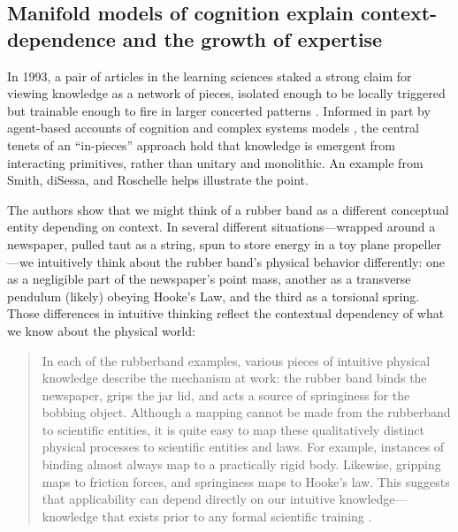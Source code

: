 \subsection{Manifold models of cognition explain context-dependence
and the growth of
expertise}\label{manifold-models-of-cognition-explain-context-dependence-and-the-growth-of-expertise}

In 1993, a pair of articles in the learning sciences staked a strong
claim for viewing knowledge as a network of pieces, isolated enough to
be locally triggered but trainable enough to fire in larger concerted
patterns \cite{disessa_epistemology_1993,smith_misconceptions_1993}. Informed
in part by agent-based accounts of cognition \cite{minsky_society_1986} and complex
systems models \cite{disessa_why_2002}, the central tenets of an ``in-pieces''
approach hold that knowledge is emergent from interacting primitives,
rather than unitary and monolithic. An example from Smith, diSessa, and
Roschelle helps illustrate the point.

The authors show that we might think of a rubber band as a different
conceptual entity depending on context. In several different
situations---wrapped around a newspaper, pulled taut as a string, spun
to store energy in a toy plane propeller---we intuitively think about
the rubber band's physical behavior differently: one as a negligible
part of the newspaper's point mass, another as a transverse pendulum
(likely) obeying Hooke's Law, and the third as a torsional spring. Those
differences in intuitive thinking reflect the contextual dependency of
what we know about the physical world:

\begin{quote}
  In each of the rubberband examples, various pieces of intuitive physical
  knowledge describe the mechanism at work: the rubber band binds the
  newspaper, grips the jar lid, and acts a source of springiness for the
  bobbing object. Although a mapping cannot be made from the rubberband to
  scientific entities, it is quite easy to map these qualitatively
  distinct physical processes to scientific entities and laws. For
  example, instances of binding almost always map to a practically rigid
  body. Likewise, gripping maps to friction forces, and springiness maps
  to Hooke's law. This suggests that applicability can depend directly on
  our intuitive knowledge---knowledge that exists prior to any formal
  scientific training \cite{smith_misconceptions_1993}.
\end{quote}

